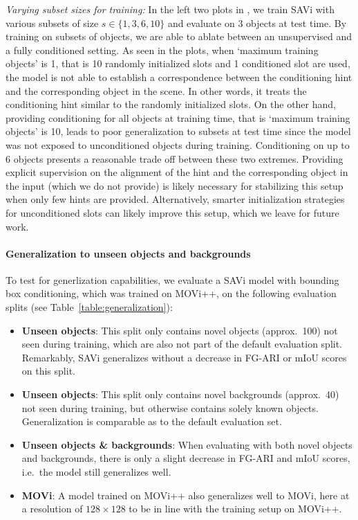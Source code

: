 \documentclass{article}
\newcommand{\modelname}{SAVi\xspace}
\begin{document}
\textit{Varying subset sizes for training:} In the left two plots in , we train \modelname with various subsets of size $s \in \lbrace 1, 3, 6, 10\rbrace$ and evaluate on 3 objects at test time. By training on subsets of objects, we are able to ablate between an unsupervised and a fully conditioned setting. As seen in the plots, when `maximum training objects' is 1, that is 10 randomly initialized slots and 1 conditioned slot are used, the model is not able to establish a correspondence between the conditioning hint and the corresponding object in the scene. In other words, it treats the conditioning hint similar to the randomly initialized slots. On the other hand, providing conditioning for all objects at training time, that is `maximum training objects' is 10, leads to poor generalization to subsets at test time since the model was not exposed to unconditioned objects during training. Conditioning on up to 6 objects presents a reasonable trade off between these two extremes. Providing explicit supervision on the alignment of the hint and the corresponding object in the input (which we do not provide) is likely necessary for stabilizing this setup when only few hints are provided. Alternatively, smarter initialization strategies for unconditioned slots can likely improve this setup, which we leave for future work.

\paragraph{Generalization to unseen objects and backgrounds} 
To test for generlization capabilities, we evaluate a SAVi model with bounding box conditioning, which was trained on MOVi++, on the following evaluation splits (see Table~\ref{table:generalization}):
\begin{itemize}
    \item \textbf{Unseen objects}: This split only contains novel objects (approx.~100) not seen during training, which are also not part of the default evaluation split. Remarkably, SAVi generalizes without a decrease in FG-ARI or mIoU scores on this split.
    \item \textbf{Unseen objects}: This split only contains novel backgrounds (approx.~40) not seen during training, but otherwise contains solely known objects. Generalization is comparable as to the default evaluation set.
    \item \textbf{Unseen objects \& backgrounds}: When evaluating with both novel objects and backgrounds, there is only a slight decrease in FG-ARI and mIoU scores, i.e.~the model still generalizes well.
    \item \textbf{MOVi}: A model trained on MOVi++ also generalizes well to MOVi, here at a resolution of $128\times 128$ to be in line with the training setup on MOVi++.
\end{itemize}
\end{document}
